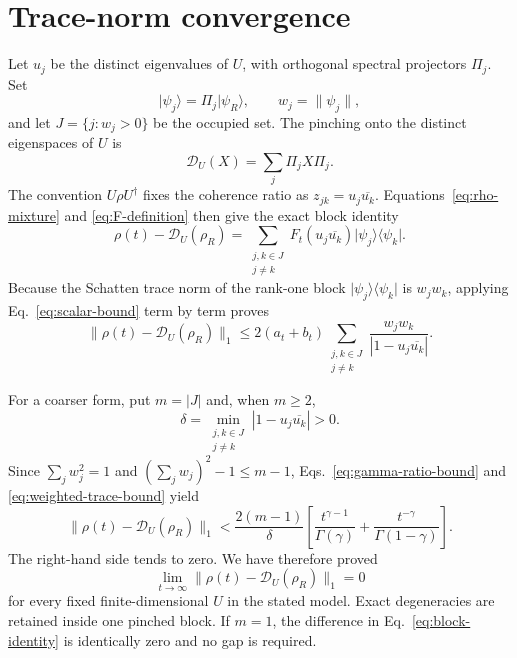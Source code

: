 \documentclass[aps,pra,reprint,superscriptaddress,longbibliography,nofootinbib]{revtex4-2}
\newcommand{\cD}{\mathcal D}
\begin{document}
\section{Trace-norm convergence}
\label{sec:trace}

Let $u_j$ be the distinct eigenvalues of $U$, with orthogonal spectral
projectors $\Pi_j$.  Set
\begin{equation}
 \lvert\psi_j\rangle=\Pi_j\lvert\psi_R\rangle,
 \qquad w_j=\|\psi_j\|,
\end{equation}
and let $J=\{j:w_j>0\}$ be the occupied set.  The pinching onto the distinct
eigenspaces of $U$ is
\begin{equation}
 \cD_U(X)=\sum_j\Pi_jX\Pi_j.
 \label{eq:pinching}
\end{equation}
The convention $U\rho U^\dagger$ fixes the coherence ratio as
$z_{jk}=u_j\overline{u_k}$.  Equations~\eqref{eq:rho-mixture} and
\eqref{eq:F-definition} then give the exact block identity
\begin{equation}
 \rho(t)-\cD_U(\rho_R)
 =\sum_{\substack{j,k\in J\\j\ne k}}
 F_t(u_j\overline{u_k})
 \lvert\psi_j\rangle\langle\psi_k\rvert.
 \label{eq:block-identity}
\end{equation}
Because the Schatten trace norm of the rank-one block
$\lvert\psi_j\rangle\langle\psi_k\rvert$ is $w_jw_k$, applying
Eq.~\eqref{eq:scalar-bound} term by term proves
\begin{equation}
 \boxed{
 \|\rho(t)-\cD_U(\rho_R)\|_1
 \leq2(a_t+b_t)
 \sum_{\substack{j,k\in J\\j\ne k}}
 \frac{w_jw_k}{|1-u_j\overline{u_k}|}.}
 \label{eq:weighted-trace-bound}
\end{equation}

For a coarser form, put $m=|J|$ and, when $m\geq2$,
\begin{equation}
 \delta=\min_{\substack{j,k\in J\\j\ne k}}
 |1-u_j\overline{u_k}|>0.
 \label{eq:delta}
\end{equation}
Since $\sum_jw_j^2=1$ and
$(\sum_jw_j)^2-1\leq m-1$, Eqs.~\eqref{eq:gamma-ratio-bound} and
\eqref{eq:weighted-trace-bound} yield
\begin{equation}
 \|\rho(t)-\cD_U(\rho_R)\|_1
 <\frac{2(m-1)}{\delta}\left[
 \frac{t^{\gamma-1}}{\Gamma(\gamma)}
 +\frac{t^{-\gamma}}{\Gamma(1-\gamma)}\right].
 \label{eq:coarse-trace-bound}
\end{equation}
The right-hand side tends to zero.  We have therefore proved
\begin{equation}
 \boxed{\lim_{t\to\infty}
 \|\rho(t)-\cD_U(\rho_R)\|_1=0}
 \label{eq:main-limit}
\end{equation}
for every fixed finite-dimensional $U$ in the stated model.  Exact
degeneracies are retained inside one pinched block.  If $m=1$, the difference
in Eq.~\eqref{eq:block-identity} is identically zero and no gap is required.
\end{document}
